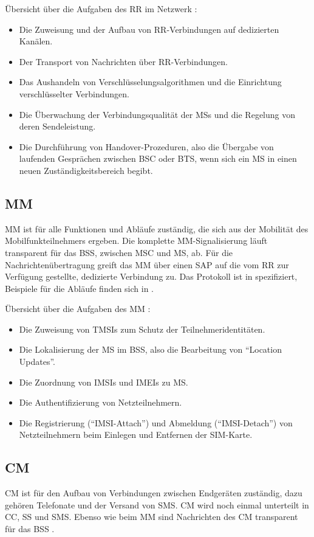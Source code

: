 Übersicht über die Aufgaben des \ac{RR} im Netzwerk :
\begin{itemize}
\item Die Zuweisung und der Aufbau von \ac{RR}-Verbindungen auf dedizierten Kanälen.
\item Der Transport von Nachrichten über \ac{RR}-Verbindungen.
\item Das Aushandeln von Verschlüsselungsalgorithmen und die Einrichtung verschlüsselter Verbindungen.
\item Die Überwachung der Verbindungsqualität der \acp{MS} und die Regelung von deren Sendeleistung.
\item Die Durchführung von Handover-Prozeduren, also die Übergabe von laufenden Gesprächen zwischen \ac{BSC} oder \ac{BTS}, wenn sich ein \ac{MS} in einen neuen Zuständigkeitsbereich begibt.
\end{itemize}

\subsection{\acl{MM}}
\acf{MM} ist für alle Funktionen und Abläufe zuständig, die sich aus der Mobilität des Mobilfunkteilnehmers ergeben. Die komplette \ac{MM}-Signalisierung läuft transparent für das \ac{BSS}, zwischen \ac{MSC} und \ac{MS}, ab. Für die Nachrichtenübertragung greift das \ac{MM} über einen \ac{SAP} auf die vom \ac{RR} zur Verfügung gestellte, dedizierte Verbindung zu. Das Protokoll ist in  spezifiziert, Beispiele für die Abläufe finden sich in .

Übersicht über die Aufgaben des \ac{MM} :
\begin{itemize}
\item Die Zuweisung von \acp{TMSI} zum Schutz der Teilnehmeridentitäten.
\item Die Lokalisierung der \ac{MS} im \ac{BSS}, also die Bearbeitung von "`Location Updates"'.
\item Die Zuordnung von \acp{IMSI} und \acp{IMEI} zu \ac{MS}.
\item Die Authentifizierung von Netzteilnehmern.
\item Die Registrierung ("`\ac{IMSI}-Attach"') und Abmeldung ("`\ac{IMSI}-Detach"') von Netzteilnehmern beim Einlegen und Entfernen der \ac{SIM}-Karte.
\end{itemize}

\subsection{\acl{CM}}
\acf{CM} ist für den Aufbau von Verbindungen zwischen Endgeräten zuständig, dazu gehören Telefonate und der Versand von \ac{SMS}. \ac{CM} wird noch einmal unterteilt in \acf{CC}, \acf{SS} und \ac{SMS}. Ebenso wie beim \ac{MM} sind Nachrichten des \ac{CM} transparent für das \ac{BSS} .

